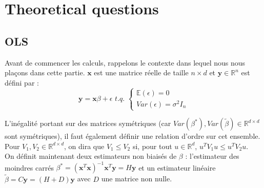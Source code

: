 \documentclass[a4paper, 10pt]{article}
\newcommand{\R}{\mathbb{R}}
\begin{document}
\section{Theoretical questions}

	\subsection{OLS}

Avant de commencer les calculs, rappelons le contexte dans lequel nous nous plaçons dans cette partie. $\textbf{x}$ est une matrice réelle de taille $n \times d$ et $\textbf{y} \in \R^{n}$ est défini par : \[ \textbf{y} = \textbf{x}\beta + \epsilon \,\, t.q. \,\, \left\{ \begin{array}{c}
\mathbb{E} \left( \epsilon \right) = 0 \\
Var \left( \epsilon \right) = \sigma^{2} I_{n} \end{array}\right. \]

L'inégalité portant sur des matrices symétriques (car $Var \left( \beta^{*} \right), Var \left( \tilde{\beta} \right) \in \R^{d \times d}$ sont symétriques), il faut également définir une relation d'ordre sur cet ensemble. Pour $V_{1}, V_{2} \in \R^{d \times d}$, on dira que $V_{1} \leq V_{2}$ si, pour tout $u \in \R^{d}$, $u^{T}V_{1}u \leq u^{T}V_{2}u$. \\

On définit maintenant deux estimateurs non biaisés de $\beta$ : l'estimateur des moindres carrés $\beta^{*} = \left( \textbf{x}^{T} \textbf{x} \right)^{-1}\textbf{x}^{T} \textbf{y} = H \textbf{y}$ et un estimateur linéaire $\tilde{\beta} = C \textbf{y} = \left( H + D \right) \textbf{y}$ avec $D$ une matrice non nulle. \\
\end{document}
